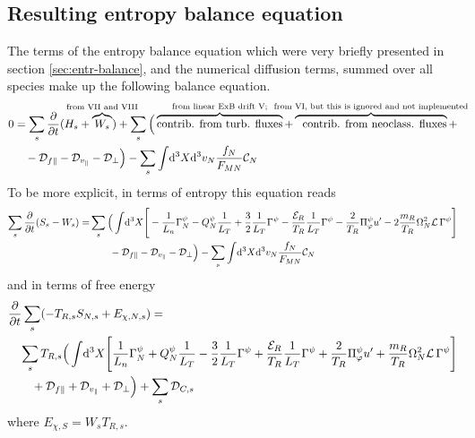 \subsection{Resulting entropy balance equation\label{sec:result-entropy-balance}}

The terms of the entropy balance equation which were very briefly presented
in section \ref{sec:entr-balance}, and the numerical diffusion terms,
summed over all species make up the following balance equation.
\begin{align}
  0 &= \sum_s\pd{}{t}(H_s + \overbrace{W_s}^{\text{\makebox[0pt]{from VII and VIII}}}) + \sum_s\Big(\overbrace{\text{contrib. from turb. fluxes}}^{\text{\makebox[0pt]{from linear ExB drift V;}}} + \overbrace{\text{\ \ contrib. from neoclass. fluxes}}^{\text{\makebox[0pt]{from VI, but this is ignored and not implemented}}}  + \nonumber \\
  &\quad{}-\mathcal{D}_{f\parallel} - \mathcal{D}_{v_\parallel} - \mathcal{D}_{\perp} \Big) - \sum_s\int\!\ud^3X\ud^3v_N\frac{f_N}{F_{MN}}\mathcal{C}_N
\end{align}
To be more explicit, in terms of entropy this equation reads
\begin{align}  \label{eq:result-entropy-balance}
 \sum_s\frac{\partial }{\partial t}(S_s - W_s) =&\sum_s\Big(\int\!\mathrm{d}^3X \Bigg[-\frac{1}{L_n}\Gamma_N^\psi - Q_N^\psi\frac{1}{L_T}
  +\frac{3}{2}\frac{1}{L_T}\Gamma^\psi - \frac{\mathcal{E}_R}{T_R}\frac{1}{L_T}\Gamma^\psi 
  - \frac{2}{T_R}\Pi_\varphi^\psi u^\prime
  - 2\frac{m_R}{T_R}\Omega_N^2\mathcal{L}\,\Gamma^\psi \Bigg]\nonumber\\
 &\quad\quad-\mathcal{D}_{f\parallel} -\mathcal{D}_{v_\parallel} -\mathcal{D}_{\perp}\Big)
- \sum_s\int\!\mathrm{d}^3X\mathrm{d}^3v_N\frac{f_N}{F_{MN}}\mathcal{C}_N
\end{align}
and in terms of free energy
\begin{align}
  & \frac{\partial }{\partial t}\sum_s(-T_{R,s}S_{N,s} + E_{\chi,N,s}) = {}\nonumber\\
&\quad\sum_sT_{R,s}\Big(\int\!\mathrm{d}^3X \Bigg[\frac{1}{L_n}\Gamma_N^\psi + Q_N^\psi\frac{1}{L_T}
  -\frac{3}{2}\frac{1}{L_T}\Gamma^\psi + \frac{\mathcal{E}_R}{T_R}\frac{1}{L_T}\Gamma^\psi
  + \frac{2}{T_R}\Pi_\varphi^\psi u^\prime
  + \frac{m_R}{T_R}\Omega_N^2\mathcal{L}\,\Gamma^\psi \Bigg]\nonumber\\
 &\quad\quad+\mathcal{D}_{f\parallel} +\mathcal{D}_{v_\parallel} +\mathcal{D}_{\perp}\Big)
+ \sum_s\mathcal{D}_{C,s}
\end{align}
where $E_{\chi,S}=W_sT_{R,s}$.


